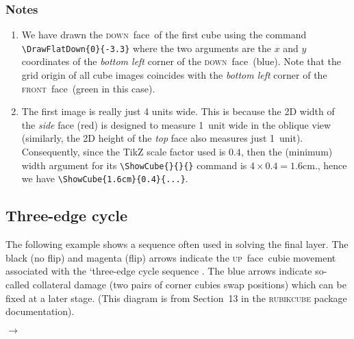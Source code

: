 \documentclass[a4paper]{article}
\newcommand{\upface}{\textsc{up}\ face}
\newcommand{\downface}{\textsc{down}\ face}
\newcommand{\frontface}{\textsc{front}\ face}
\begin{document}
\subsubsection*{Notes}

\begin{enumerate} 

 \item   We have drawn the  \downface\ of the first cube using the command
\verb!\DrawFlatDown{0}{-3.3}! where the two arguments are  the $x$ and 
$y$ coordinates of the \textit{bottom left} corner of the \downface\  (blue). 
Note that the grid origin of  all cube images  coincides with the 
\textit{bottom left} corner of the \frontface\ (green in this case).

\item   The first image is really just 4 units wide. This is because the 2D width 
of the  \textit{side}  face (red) is designed to measure  1~unit wide in the 
oblique view (similarly, the 2D height of the  \textit{top} face also measures 
just 1~unit). Consequently, since the TikZ scale factor used is $0.4$, then 
the (minimum) width argument for its \verb!\ShowCube{}{}{}! command is 
$4\times 0.4 = 1.6$cm., hence we have \verb!\ShowCube{1.6cm}{0.4}{...}!.

\end{enumerate}



\pagebreak
\subsection{Three-edge cycle}


The following example shows a sequence often used in solving the final layer.
 The black (no flip) and magenta (flip) arrows indicate  the \upface\  
cubie movement associated with the `three-edge cycle sequence 
. The blue arrows indicate so-called 
collateral damage (two pairs of corner cubies swap positions) which can be fixed 
at a later stage. (This diagram  is from Section~13 in the 
\textsc{rubikcube} package documentation).

 \bigskip%
 \noindent\hfil%
 \RubikCubeSolved%
 \quad{}%
 \quad\ShowSequence{}{\Rubik}{\SequenceLong}\quad$\longrightarrow$\quad%
 \ShowCube{1.6cm}{0.4}{\DrawFlatUpSide}%
 \hfil%
 
\end{document}
